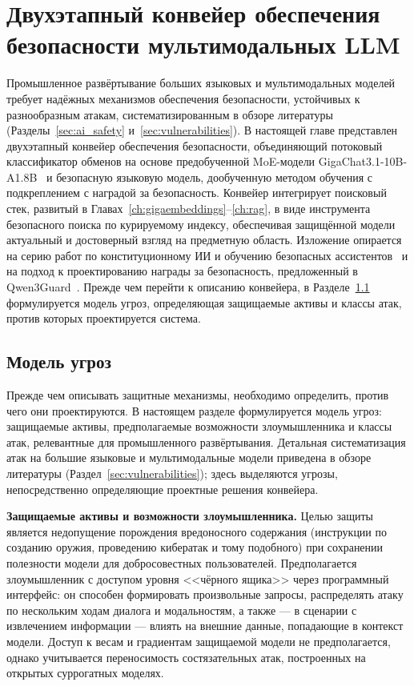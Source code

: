 \chapter{Двухэтапный конвейер обеспечения безопасности мультимодальных LLM}\label{ch:safety}

Промышленное развёртывание больших языковых и мультимодальных моделей требует надёжных механизмов обеспечения безопасности, устойчивых к разнообразным атакам, систематизированным в обзоре литературы (Разделы~\ref{sec:ai_safety} и~\ref{sec:vulnerabilities}).
В настоящей главе представлен двухэтапный конвейер обеспечения безопасности, объединяющий потоковый классификатор обменов на основе предобученной MoE-модели GigaChat3.1-10B-A1.8B~\cite{gigachat3_10b} и безопасную языковую модель, дообученную методом обучения с подкреплением с наградой за безопасность.
Конвейер интегрирует поисковый стек, развитый в Главах~\ref{ch:gigaembeddings}--\ref{ch:rag}, в виде инструмента безопасного поиска по курируемому индексу, обеспечивая защищённой модели актуальный и достоверный взгляд на предметную область.
Изложение опирается на серию работ по конституционному ИИ и обучению безопасных ассистентов~\cite{bai2022cai,bai2022hhrlhf,sharma2025cc,cunningham2026ccpp} и на подход к проектированию награды за безопасность, предложенный в Qwen3Guard~\cite{2510.14276}.
Прежде чем перейти к описанию конвейера, в Разделе~\ref{sec:sp_threat_model} формулируется модель угроз, определяющая защищаемые активы и классы атак, против которых проектируется система.

\section{Модель угроз}\label{sec:sp_threat_model}

Прежде чем описывать защитные механизмы, необходимо определить, против чего они проектируются.
В настоящем разделе формулируется модель угроз: защищаемые активы, предполагаемые возможности злоумышленника и классы атак, релевантные для промышленного развёртывания.
Детальная систематизация атак на большие языковые и мультимодальные модели приведена в обзоре литературы (Раздел~\ref{sec:vulnerabilities}); здесь выделяются угрозы, непосредственно определяющие проектные решения конвейера.

\textbf{Защищаемые активы и возможности злоумышленника.} Целью защиты является недопущение порождения вредоносного содержания (инструкции по созданию оружия, проведению кибератак и тому подобного) при сохранении полезности модели для добросовестных пользователей.
Предполагается злоумышленник с доступом уровня <<чёрного ящика>> через программный интерфейс: он способен формировать произвольные запросы, распределять атаку по нескольким ходам диалога и модальностям, а также --- в сценарии с извлечением информации --- влиять на внешние данные, попадающие в контекст модели.
Доступ к весам и градиентам защищаемой модели не предполагается, однако учитывается переносимость состязательных атак, построенных на открытых суррогатных моделях.

